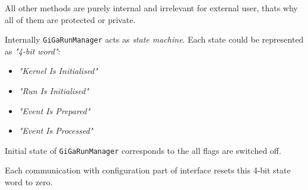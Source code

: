 \documentclass[nfss,times,12pt,a4paper]{article}
\begin{document}
{All other methods are purely internal and 
irrelevant for external user, thats why all 
of them are protected or private. 

Internally {\tt GiGaRunManager} acts as {\it state machine}.
Each state could be represented as {\it "4-bit word"}:
\begin{itemize}
\item {\it "Kernel Is Initialised" } 
\item {\it "Run    Is Initialised" } 
\item {\it "Event  Is Prepared"    } 
\item {\it "Event  Is Processed"   } 
\end{itemize}
   
Initial state of {\tt GiGaRunManager} corresponds to the all flags are switched off. 

Each communication with configuration part of interface
resets this 4-bit state word to zero. 

}
\end{document}
